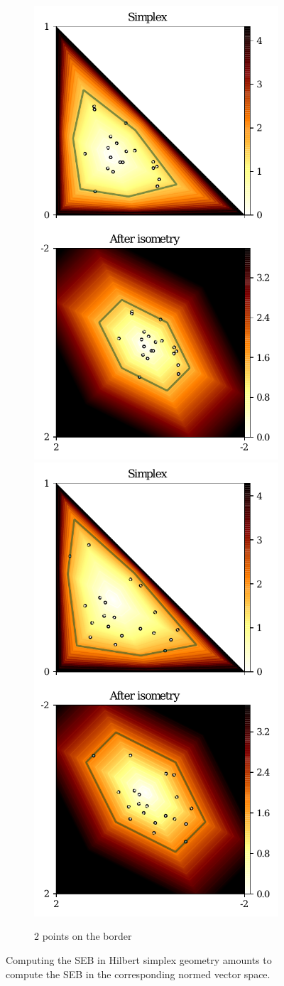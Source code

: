 \documentclass[graybox]{svmult}
\begin{document}
\begin{figure}[t]
\begin{subfigure}[m]{.48\textwidth}
\includegraphics[width=.5\textwidth]{harpe2020.pdf}%
\includegraphics[width=.5\textwidth]{harpe2028.pdf}
\caption{$2$ points on the border}
\end{subfigure}
\caption{Computing the SEB in Hilbert simplex geometry
amounts to compute the SEB in the corresponding normed
vector space.\label{fig:SEB}}
\end{figure}
\end{document}
